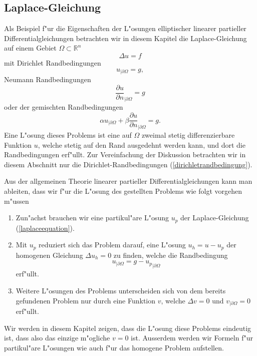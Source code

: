 \subsection{Laplace-Gleichung}
Als Beispiel f"ur die Eigenschaften der L"osungen
elliptischer linearer partieller Differentialgleichungen
betrachten wir in diesem Kapitel die Laplace-Gleichung
auf einem Gebiet $\Omega\subset\mathbb R^n$
\begin{equation}
\Delta u=f
\label{laplaceequation}
\end{equation}
mit
Dirichlet Randbedingungen
\begin{equation}
u_{|\partial \Omega}=g,
\label{dirichletrandbedingung}
\end{equation}
Neumann Randbedingungen
\[
\frac{\partial u}{\partial n}_{|\partial \Omega}=g
\]
oder der gemischten Randbedingungen
\[
\alpha u_{|\partial \Omega}+
\beta\frac{\partial u}{\partial n}_{|\partial \Omega}=g.
\]
Eine L"osung dieses Problems ist eine auf $\Omega$
zweimal stetig differenzierbare
Funktion $u$, welche stetig auf den Rand ausgedehnt werden kann,
und dort die Randbedingungen erf"ullt. Zur Vereinfachung der
Diskussion betrachten wir in diesem Abschnitt nur die
Dirichlet-Randbedingungen (\ref{dirichletrandbedingung}).

Aus der allgemeinen Theorie linearer partieller Differentialgleichungen
kann man ableiten, dass wir f"ur
die L"osung des gestellten Problems wie folgt vorgehen m"ussen
\begin{enumerate}
\item Zun"achst brauchen wir eine partikul"are
L"osung $u_p$ der Laplace-Gleichung (\ref{laplaceequation}).
\item Mit $u_p$ reduziert sich das Problem darauf, eine L"osung
$u_h=u-u_p$ der homogenen Gleichung $\Delta u_h=0$
zu finden, welche die Randbedingung
\[
u_{|\partial\Omega}=g-{u_p}_{|\partial\Omega}
\]
erf"ullt.
\item
Weitere L"osungen des Problems unterscheiden sich von dem
bereits gefundenen Problem nur durch eine Funktion $v$, welche
$\Delta v=0$ und $v_{|\partial\Omega}=0$ erf"ullt.
\end{enumerate}
Wir werden in diesem Kapitel zeigen, dass die L"osung diese Problems
eindeutig ist, dass also das einzige m"ogliche $v=0$ ist.
Ausserdem werden wir Formeln f"ur partikul"are L"osungen wie auch f"ur
das homogene Problem aufstellen.

